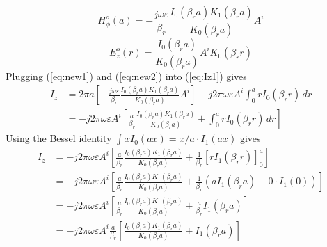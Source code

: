 \begin{equation}\label{eq:new1}
	H_\phi^o(a) = -\frac{j \omega \varepsilon}{\beta_r} \frac{I_0(\beta_r a) K_1(\beta_r a)}{K_0(\beta_r a)} A^i
\end{equation}
\begin{equation}\label{eq:new2}
	E_z^o(r) = \frac{I_0(\beta_r a)}{K_0(\beta_r a)} A^i K_0(\beta_r r)
\end{equation}
Plugging (\ref{eq:new1}) and (\ref{eq:new2}) into (\ref{eq:Iz1}) gives
\begin{equation}\label{eq:Iz1}
	\begin{split}
		I_z &= 2\pi a \left[ -\frac{j \omega \varepsilon}{\beta_r} \frac{I_0(\beta_r a) K_1(\beta_r a)}{K_0(\beta_r a)} A^i \right] 
		- j 2\pi \omega \varepsilon A^i \int_0^a r I_0(\beta_r r) \, dr \\
		&= -j 2\pi \omega \varepsilon A^i \left[ \frac{a}{\beta_r} \frac{I_0(\beta_r a) K_1(\beta_r a)}{K_0(\beta_r a)} + \int_0^a r I_0(\beta_r r) \, dr \right]
	\end{split}
\end{equation}
Using the Bessel identity $\int xI_{0}(ax)=x/a\cdot I_{1}(ax)$ gives 
\begin{equation}\label{eq:Izf}
	\begin{split}
		I_z &= -j 2\pi \omega \varepsilon A^i \left[
		\frac{a}{\beta_r} \frac{I_0(\beta_r a) K_1(\beta_r a)}{K_0(\beta_r a)} + \frac{1}{\beta_r} \left[ r I_1(\beta_r r) \right]_0^a
		\right] \\
		&= -j 2\pi \omega \varepsilon A^i \left[
		\frac{a}{\beta_r} \frac{I_0(\beta_r a) K_1(\beta_r a)}{K_0(\beta_r a)} + \frac{1}{\beta_r} \left( a I_1(\beta_r a) - 0 \cdot I_1(0) \right)
		\right] \\
		&= -j 2\pi \omega \varepsilon A^i \left[
		\frac{a}{\beta_r} \frac{I_0(\beta_r a) K_1(\beta_r a)}{K_0(\beta_r a)} + \frac{a}{\beta_r} I_1(\beta_r a)
		\right] \\
		&= -j 2\pi \omega \varepsilon A^i \frac{a}{\beta_r} \left[
		\frac{I_0(\beta_r a) K_1(\beta_r a)}{K_0(\beta_r a)} + I_1(\beta_r a)
		\right] 		
	\end{split}
\end{equation}
